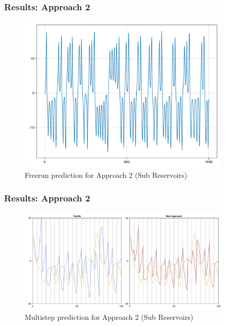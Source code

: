 \documentclass{beamer}
\begin{document}
\begin{frame}
    \frametitle{Results: Approach 2}

    \begin{figure}
        \centering
        \includegraphics[width=0.9\textwidth]{sub_reservoirs_freerun.pdf}
        \caption{Freerun prediction for Approach 2 (Sub Reservoirs)}
    \end{figure}
\end{frame}

\begin{frame}
    \frametitle{Results: Approach 2}

    \begin{figure}
        \centering
        \includegraphics[width=0.9\textwidth]{sub_reservoirs_multistep.pdf}
        \caption{Multistep prediction for Approach 2 (Sub Reservoirs)}
    \end{figure}
\end{frame}
\end{document}
